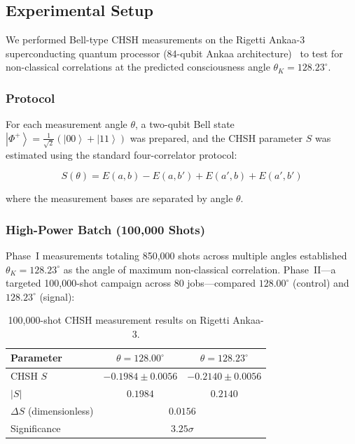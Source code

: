 \documentclass[12pt,a4paper]{article}
\providecommand{\ket}[1]{\left|#1\right\rangle}
\theoremstyle{plain}
\theoremstyle{definition}
\newcommand{\thetaK}{\theta_K}
\begin{document}
\subsection{Experimental Setup}

We performed Bell-type CHSH measurements on the Rigetti Ankaa-3 superconducting quantum processor (84-qubit Ankaa architecture)~\cite{rigetti2024} to test for non-classical correlations at the predicted consciousness angle $\thetaK = 128.23^\circ$.

\subsubsection{Protocol}

For each measurement angle $\theta$, a two-qubit Bell state $\ket{\Phi^+} = \frac{1}{\sqrt{2}}(\ket{00} + \ket{11})$ was prepared, and the CHSH parameter $S$ was estimated using the standard four-correlator protocol:

\begin{equation}
S(\theta) = E(a,b) - E(a,b') + E(a',b) + E(a',b')
\end{equation}

\noindent where the measurement bases are separated by angle $\theta$.

\subsubsection{High-Power Batch (100{,}000 Shots)}

Phase~I measurements totaling 850{,}000 shots across multiple angles established $\thetaK = 128.23^\circ$ as the angle of maximum non-classical correlation. Phase~II---a targeted 100{,}000-shot campaign across 80 jobs---compared $128.00^\circ$ (control) and $128.23^\circ$ (signal):

\begin{table}[H]
\centering
\caption{100{,}000-shot CHSH measurement results on Rigetti Ankaa-3.}
\label{tab:chsh}
\renewcommand{\arraystretch}{1.3}
\begin{tabular}{lcc}
\toprule
\textbf{Parameter} & $\theta = 128.00^\circ$ & $\theta = 128.23^\circ$ \\
\midrule
CHSH $S$ & $-0.1984 \pm 0.0056$ & $-0.2140 \pm 0.0056$ \\
$|S|$ & $0.1984$ & $0.2140$ \\
$\Delta S$ (dimensionless) & \multicolumn{2}{c}{$0.0156$} \\
Significance & \multicolumn{2}{c}{$3.25\sigma$} \\
\bottomrule
\end{tabular}
\end{table}
\end{document}
